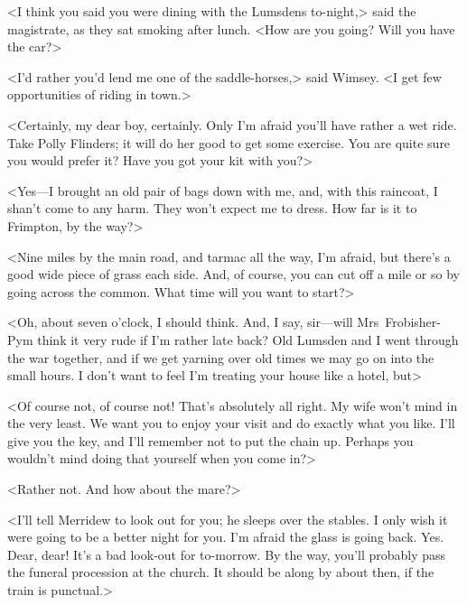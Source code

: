 \divider
<I think you said you were dining with the Lumsdens to-night,> said the magistrate, as they sat smoking after lunch. <How are you going? Will you have the car?>

<I'd rather you'd lend me one of the saddle-horses,> said Wimsey. <I get few opportunities of riding in town.>

<Certainly, my dear boy, certainly. Only I'm afraid you'll have rather a wet ride. Take Polly Flinders; it will do her good to get some exercise. You are quite sure you would prefer it? Have you got your kit with you?>

<Yes—I brought an old pair of bags down with me, and, with this raincoat, I shan't come to any harm. They won't expect me to dress. How far is it to Frimpton, by the way?>

<Nine miles by the main road, and tarmac all the way, I'm afraid, but there's a good wide piece of grass each side. And, of course, you can cut off a mile or so by going across the common. What time will you want to start?>

<Oh, about seven o'clock, I should think. And, I say, sir—will Mrs~Frobisher-Pym think it very rude if I'm rather late back? Old Lumsden and I went through the war together, and if we get yarning over old times we may go on into the small hours. I don't want to feel I'm treating your house like a hotel, but\longdash>

<Of course not, of course not! That's absolutely all right. My wife won't mind in the very least. We want you to enjoy your visit and do exactly what you like. I'll give you the key, and I'll remember not to put the chain up. Perhaps you wouldn't mind doing that yourself when you come in?>

<Rather not. And how about the mare?>

<I'll tell Merridew to look out for you; he sleeps over the stables. I only wish it were going to be a better night for you. I'm afraid the glass is going back. Yes. Dear, dear! It's a bad look-out for to-morrow. By the way, you'll probably pass the funeral procession at the church. It should be along by about then, if the train is punctual.>

